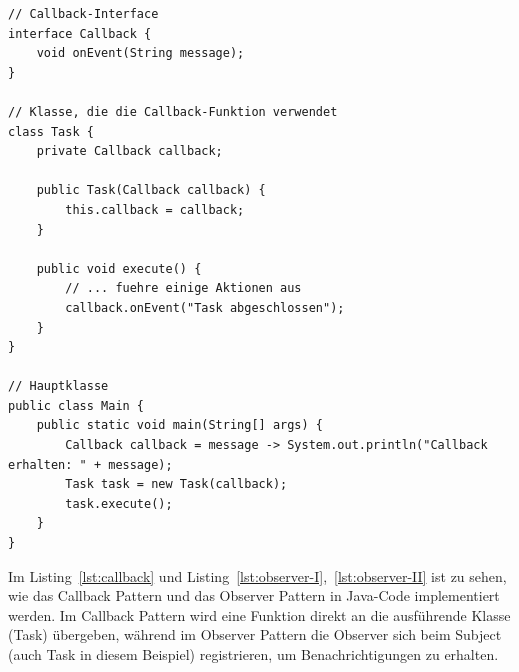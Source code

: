 \documentclass[../vs-script-first-v01.tex]{subfiles}
\begin{document}
\noindent\begin{minipage}{\textwidth}
\begin{lstlisting}[caption={Callback Pattern},captionpos=b,label={lst:callback}]
// Callback-Interface
interface Callback {
    void onEvent(String message);
}

// Klasse, die die Callback-Funktion verwendet
class Task {
    private Callback callback;

    public Task(Callback callback) {
        this.callback = callback;
    }

    public void execute() {
        // ... fuehre einige Aktionen aus
        callback.onEvent("Task abgeschlossen");
    }
}

// Hauptklasse
public class Main {
    public static void main(String[] args) {
        Callback callback = message -> System.out.println("Callback erhalten: " + message);
        Task task = new Task(callback);
        task.execute();
    }
}
\end{lstlisting}
\end{minipage}
Im Listing~\ref{lst:callback} und Listing~\ref{lst:observer-I},~\ref{lst:observer-II} ist zu sehen, wie das Callback Pattern und das Observer Pattern in Java-Code implementiert werden. Im Callback Pattern wird eine Funktion direkt an die ausführende Klasse (Task) übergeben, während im Observer Pattern die Observer sich beim Subject (auch Task in diesem Beispiel) registrieren, um Benachrichtigungen zu erhalten.
\end{document}
